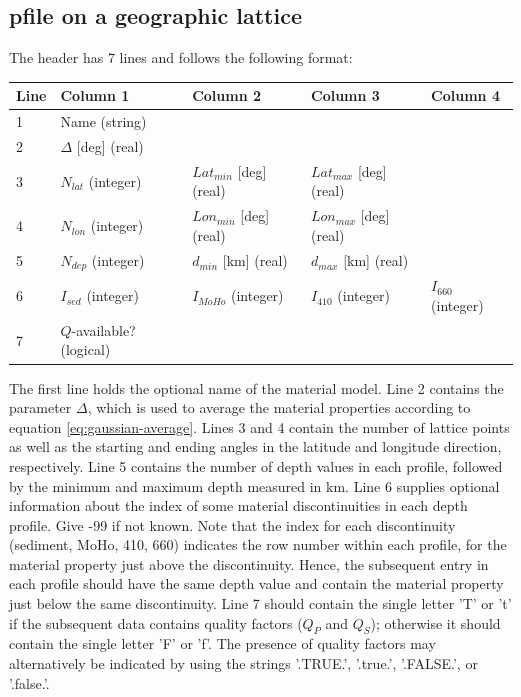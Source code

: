 \documentclass[11pt]{report}
\begin{document}
{\subsection{pfile on a geographic lattice}
The header has 7 lines and follows the following format:
\begin{center}
	\begin{tabular}{lllll}\hline
		Line & Column 1                 & Column 2                 & Column 3                 & Column 4            \\ \hline
		1    & Name (string)            &                          &                          &                     \\ \hline
		2    & $\Delta$ [deg] (real)    &                          &                          &                     \\ \hline
		3    & $N_{lat}$ (integer)      & $Lat_{min}$ [deg] (real) & $Lat_{max}$ [deg] (real) &                     \\ \hline
		4    & $N_{lon}$ (integer)      & $Lon_{min}$ [deg] (real) & $Lon_{max}$ [deg] (real) &                     \\ \hline
		5    & $N_{dep}$ (integer)      & $d_{min}$ [km] (real)    & $d_{max}$ [km] (real)    &                     \\ \hline
		6    & $I_{sed}$ (integer)      & $I_{MoHo}$ (integer)     & $I_{410}$ (integer)      & $I_{660}$ (integer) \\ \hline
		7    & $Q$-available? (logical)                                                                             \\ \hline
	\end{tabular}
\end{center}
The first line holds the optional name of the material model. Line 2 contains the parameter
$\Delta$, which is used to average the material properties according to equation \eqref{eq:gaussian-average}.
Lines 3 and 4 contain the number of lattice points as well as the starting and ending angles in the
latitude and longitude direction, respectively. Line 5 contains the number of depth values in each
profile, followed by the minimum and maximum depth measured in km. Line 6 supplies optional
information about the index of some material discontinuities in each depth profile. Give -99 if not
known. Note that the index for each discontinuity (sediment, MoHo, 410, 660) indicates the row
number within each profile, for the material property just above the discontinuity. Hence, the
subsequent entry in each profile should have the same depth value and contain the material property
just below the same discontinuity. Line 7 should contain the single letter 'T' or 't' if the
subsequent data contains quality factors ($Q_P$ and $Q_S$); otherwise it should contain the single
letter 'F' or 'f'. The presence of quality factors may alternatively be indicated by using the
strings '.TRUE.', '.true.', '.FALSE.', or '.false.'.

}
\end{document}
